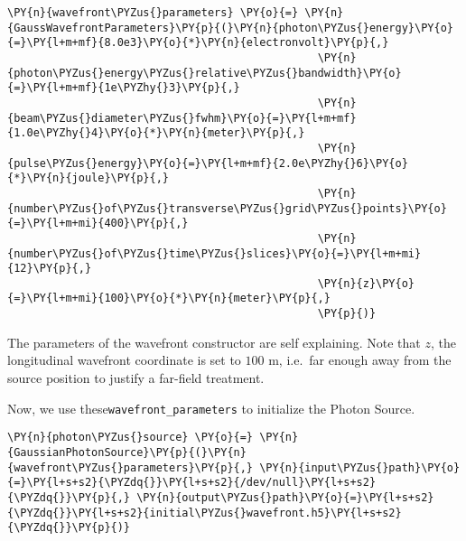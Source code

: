     \begin{tcolorbox}[breakable, size=fbox, boxrule=1pt, pad at break*=1mm,colback=cellbackground, colframe=cellborder]
\begin{Verbatim}[commandchars=\\\{\}]
\PY{n}{wavefront\PYZus{}parameters} \PY{o}{=} \PY{n}{GaussWavefrontParameters}\PY{p}{(}\PY{n}{photon\PYZus{}energy}\PY{o}{=}\PY{l+m+mf}{8.0e3}\PY{o}{*}\PY{n}{electronvolt}\PY{p}{,}
                                                \PY{n}{photon\PYZus{}energy\PYZus{}relative\PYZus{}bandwidth}\PY{o}{=}\PY{l+m+mf}{1e\PYZhy{}3}\PY{p}{,}
                                                \PY{n}{beam\PYZus{}diameter\PYZus{}fwhm}\PY{o}{=}\PY{l+m+mf}{1.0e\PYZhy{}4}\PY{o}{*}\PY{n}{meter}\PY{p}{,}
                                                \PY{n}{pulse\PYZus{}energy}\PY{o}{=}\PY{l+m+mf}{2.0e\PYZhy{}6}\PY{o}{*}\PY{n}{joule}\PY{p}{,}
                                                \PY{n}{number\PYZus{}of\PYZus{}transverse\PYZus{}grid\PYZus{}points}\PY{o}{=}\PY{l+m+mi}{400}\PY{p}{,}
                                                \PY{n}{number\PYZus{}of\PYZus{}time\PYZus{}slices}\PY{o}{=}\PY{l+m+mi}{12}\PY{p}{,}
                                                \PY{n}{z}\PY{o}{=}\PY{l+m+mi}{100}\PY{o}{*}\PY{n}{meter}\PY{p}{,}
                                                \PY{p}{)}
\end{Verbatim}
\end{tcolorbox}

    The parameters of the wavefront constructor are self explaining. Note
that \(z\), the longitudinal wavefront coordinate is set to \(100\) m,
i.e.~far enough away from the source position to justify a far-field
treatment.

    Now, we use these\texttt{wavefront\_parameters} to initialize the Photon
Source.

    \begin{tcolorbox}[breakable, size=fbox, boxrule=1pt, pad at break*=1mm,colback=cellbackground, colframe=cellborder]
\begin{Verbatim}[commandchars=\\\{\}]
\PY{n}{photon\PYZus{}source} \PY{o}{=} \PY{n}{GaussianPhotonSource}\PY{p}{(}\PY{n}{wavefront\PYZus{}parameters}\PY{p}{,} \PY{n}{input\PYZus{}path}\PY{o}{=}\PY{l+s+s2}{\PYZdq{}}\PY{l+s+s2}{/dev/null}\PY{l+s+s2}{\PYZdq{}}\PY{p}{,} \PY{n}{output\PYZus{}path}\PY{o}{=}\PY{l+s+s2}{\PYZdq{}}\PY{l+s+s2}{initial\PYZus{}wavefront.h5}\PY{l+s+s2}{\PYZdq{}}\PY{p}{)}
\end{Verbatim}
\end{tcolorbox}

